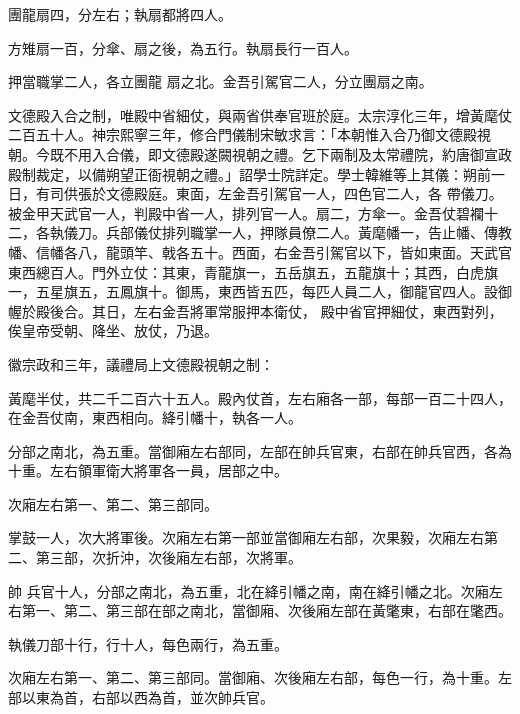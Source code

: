 \begin{pinyinscope}
 團龍扇四，分左右；執扇都將四人。



 方雉扇一百，分傘、扇之後，為五行。執扇長行一百人。



 押當職掌二人，各立團龍
 扇之北。金吾引駕官二人，分立團扇之南。



 文德殿入合之制，唯殿中省細仗，與兩省供奉官班於庭。太宗淳化三年，增黃麾仗二百五十人。神宗熙寧三年，修合門儀制宋敏求言：「本朝惟入合乃御文德殿視朝。今既不用入合儀，即文德殿遂闕視朝之禮。乞下兩制及太常禮院，約唐御宣政殿制裁定，以備朔望正衙視朝之禮。」詔學士院詳定。學士韓維等上其儀：朔前一日，有司供張於文德殿庭。東面，左金吾引駕官一人，四色官二人，各
 帶儀刀。被金甲天武官一人，判殿中省一人，排列官一人。扇二，方傘一。金吾仗碧襴十二，各執儀刀。兵部儀仗排列職掌一人，押隊員僚二人。黃麾幡一，告止幡、傳教幡、信幡各八，龍頭竿、戟各五十。西面，右金吾引駕官以下，皆如東面。天武官東西總百人。門外立仗：其東，青龍旗一，五岳旗五，五龍旗十；其西，白虎旗一，五星旗五，五鳳旗十。御馬，東西皆五匹，每匹人員二人，御龍官四人。設御幄於殿後合。其日，左右金吾將軍常服押本衛仗，
 殿中省官押細仗，東西對列，俟皇帝受朝、降坐、放仗，乃退。



 徽宗政和三年，議禮局上文德殿視朝之制：



 黃麾半仗，共二千二百六十五人。殿內仗首，左右廂各一部，每部一百二十四人，在金吾仗南，東西相向。絳引幡十，執各一人。



 分部之南北，為五重。當御廂左右部同，左部在帥兵官東，右部在帥兵官西，各為十重。左右領軍衛大將軍各一員，居部之中。



 次廂左右第一、第二、第三部同。



 掌鼓一人，次大將軍後。次廂左右第一部並當御廂左右部，次果毅，次廂左右第二、第三部，次折沖，次後廂左右部，次將軍。



 帥
 兵官十人，分部之南北，為五重，北在絳引幡之南，南在絳引幡之北。次廂左右第一、第二、第三部在部之南北，當御廂、次後廂左部在黃氅東，右部在氅西。



 執儀刀部十行，行十人，每色兩行，為五重。



 次廂左右第一、第二、第三部同。當御廂、次後廂左右部，每色一行，為十重。左部以東為首，右部以西為首，並次帥兵官。




\end{pinyinscope}
